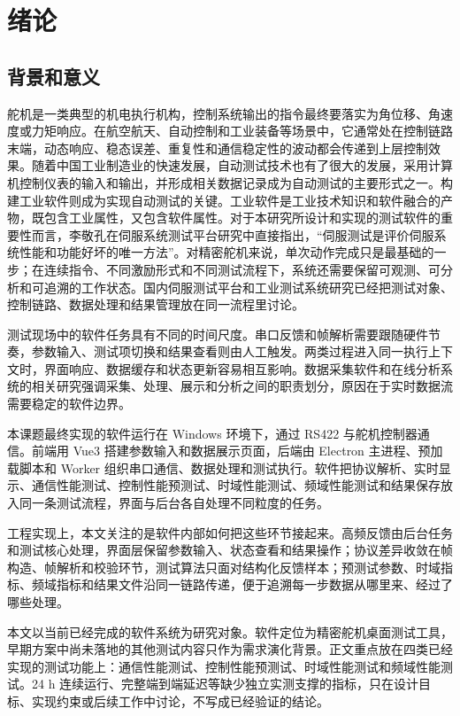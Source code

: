 \chapter{绪论}

\section{背景和意义}

舵机是一类典型的机电执行机构，控制系统输出的指令最终要落实为角位移、角速度或力矩响应。在航空航天、自动控制和工业装备等场景中，它通常处在控制链路末端，动态响应、稳态误差、重复性和通信稳定性的波动都会传递到上层控制效果。随着中国工业制造业的快速发展，自动测试技术也有了很大的发展，采用计算机控制仪表的输入和输出，并形成相关数据记录成为自动测试的主要形式之一。构建工业软件则成为实现自动测试的关键。工业软件是工业技术知识和软件融合的产物，既包含工业属性，又包含软件属性。对于本研究所设计和实现的测试软件的重要性而言，李敬孔在伺服系统测试平台研究中直接指出，``伺服测试是评价伺服系统性能和功能好坏的唯一方法''\cite{li2014servotest}。对精密舵机来说，单次动作完成只是最基础的一步；在连续指令、不同激励形式和不同测试流程下，系统还需要保留可观测、可分析和可追溯的工作状态。国内伺服测试平台和工业测试系统研究已经把测试对象、控制链路、数据处理和结果管理放在同一流程里讨论\cite{li2014servotest,xu2021industry4test,liu2022industrialsoftware}。

测试现场中的软件任务具有不同的时间尺度。串口反馈和帧解析需要跟随硬件节奏，参数输入、测试项切换和结果查看则由人工触发。两类过程进入同一执行上下文时，界面响应、数据缓存和状态更新容易相互影响。数据采集软件和在线分析系统的相关研究强调采集、处理、展示和分析之间的职责划分，原因在于实时数据流需要稳定的软件边界\cite{stansbury2023autodidaqt,turkmanovic2023highspeed}。

本课题最终实现的软件运行在 Windows 环境下，通过 RS422 与舵机控制器通信。前端用 Vue3 搭建参数输入和数据展示页面，后端由 Electron 主进程、预加载脚本和 Worker 组织串口通信、数据处理和测试执行。软件把协议解析、实时显示、通信性能测试、控制性能预测试、时域性能测试、频域性能测试和结果保存放入同一条测试流程，界面与后台各自处理不同粒度的任务。

工程实现上，本文关注的是软件内部如何把这些环节接起来。高频反馈由后台任务和测试核心处理，界面层保留参数输入、状态查看和结果操作；协议差异收敛在帧构造、帧解析和校验环节，测试算法只面对结构化反馈样本；预测试参数、时域指标、频域指标和结果文件沿同一链路传递，便于追溯每一步数据从哪里来、经过了哪些处理。

本文以当前已经完成的软件系统为研究对象。软件定位为精密舵机桌面测试工具，早期方案中尚未落地的其他测试内容只作为需求演化背景。正文重点放在四类已经实现的测试功能上：通信性能测试、控制性能预测试、时域性能测试和频域性能测试。24 h 连续运行、完整端到端延迟等缺少独立实测支撑的指标，只在设计目标、实现约束或后续工作中讨论，不写成已经验证的结论。

